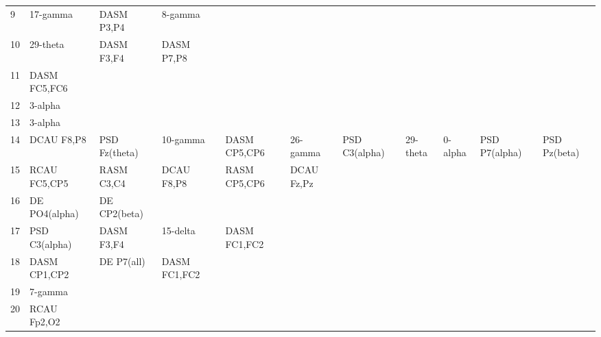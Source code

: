 \begin{landscape}
\begin{table}[]
\begin{tabular}{l|llllllll}
9        & 17-gamma       & DASM P3,P4     & 8-gamma        &                &                &                &                &                &               &              \\
10       & 29-theta       & DASM F3,F4     & DASM P7,P8     &                &                &                &                &                &               &              \\
11       & DASM FC5,FC6   &                &                &                &                &                &                &                &               &              \\
12       & 3-alpha        &                &                &                &                &                &                &                &               &              \\
13       & 3-alpha        &                &                &                &                &                &                &                &               &              \\
14       & DCAU F8,P8     & PSD Fz(theta)  & 10-gamma       & DASM CP5,CP6   & 26-gamma       & PSD C3(alpha)  & 29-theta       & 0-alpha        & PSD P7(alpha) & PSD Pz(beta) \\
15       & RCAU FC5,CP5   & RASM C3,C4     & DCAU F8,P8     & RASM CP5,CP6   & DCAU Fz,Pz     &                &                &                &               &              \\
16       & DE PO4(alpha)  & DE CP2(beta)   &                &                &                &                &                &                &               &              \\
17       & PSD C3(alpha)  & DASM F3,F4     & 15-delta       & DASM FC1,FC2   &                &                &                &                &               &              \\
18       & DASM CP1,CP2   & DE P7(all)     & DASM FC1,FC2   &                &                &                &                &                &               &              \\
19       & 7-gamma        &                &                &                &                &                &                &                &               &              \\
20       & RCAU Fp2,O2    &                &                &                &                &                &                &                &               &              \\

\end{tabular}
\end{table}
\end{landscape}
